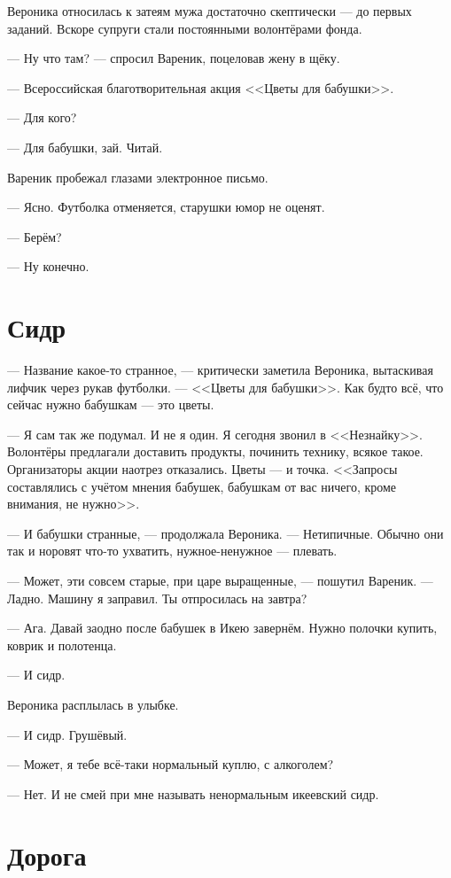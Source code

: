 \documentclass[a4paper,10pt,fleqn]{book}\usepackage{polyglossia}\setdefaultlanguage{english}\setotherlanguage{russian}\defaultfontfeatures{Ligatures=TeX,Mapping=tex-text} \usepackage{xcolor}\definecolor{lightgray}{HTML}{bbbbbb}\color{lightgray}\newcommand{\ml}[3]{\textcolor{black}{#3}}
\begin{document}
Вероника относилась к затеям мужа достаточно скептически --- до первых заданий.
Вскоре супруги стали постоянными волонтёрами фонда.

--- Ну что там? --- спросил Вареник, поцеловав жену в щёку.

--- Всероссийская благотворительная акция <<Цветы для бабушки>>.

--- Для кого?

--- Для бабушки, зай.
Читай.

Вареник пробежал глазами электронное письмо.

--- Ясно.
Футболка отменяется, старушки юмор не оценят.

--- Берём?

--- Ну конечно.

\section{Сидр}

--- Название какое-то странное, --- критически заметила Вероника, вытаскивая лифчик через рукав футболки.
--- <<Цветы для бабушки>>.
Как будто всё, что сейчас нужно бабушкам --- это цветы.

--- Я сам так же подумал.
И не я один.
Я сегодня звонил в <<Незнайку>>.
Волонтёры предлагали доставить продукты, починить технику, всякое такое.
Организаторы акции наотрез отказались.
Цветы --- и точка.
<<Запросы составлялись с учётом мнения бабушек, бабушкам от вас ничего, кроме внимания, не нужно>>.

--- И бабушки странные, --- продолжала Вероника.
--- Нетипичные.
Обычно они так и норовят что-то ухватить, нужное-ненужное --- плевать.

--- Может, эти совсем старые, при царе выращенные, --- пошутил Вареник.
--- Ладно.
Машину я заправил.
Ты отпросилась на завтра?

--- Ага.
Давай заодно после бабушек в Икею завернём.
Нужно полочки купить, коврик и полотенца.

--- И сидр.

Вероника расплылась в улыбке.

--- И сидр.
Грушёвый.

--- Может, я тебе всё-таки нормальный куплю, с алкоголем?

--- Нет.
И не смей при мне называть ненормальным икеевский сидр.

\section{Дорога}
\end{document}
